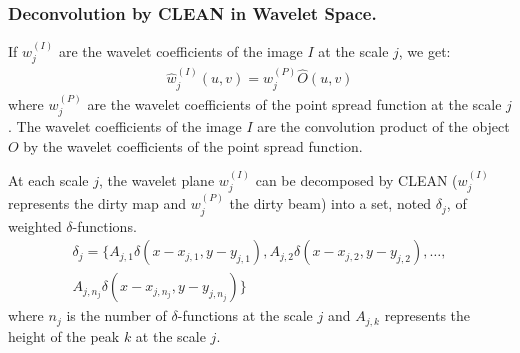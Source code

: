 \documentclass[11pt,a4paper]{article}
\begin{document}
\subsubsection{Deconvolution by CLEAN in Wavelet Space.}

If $w_j^{(I)}$ are the wavelet 
coefficients of  the image $I$ at the scale $j$, we
get:
\begin{eqnarray}
\hat{w}_j^{(I)}(u,v) =  \hat{w}_j^{(P)} \hat{O}(u,v) 
\end{eqnarray}
where $w_{j}^{(P)}$ are the wavelet coefficients of the point spread 
function at the scale $j$.
The wavelet coefficients of the image $I$ are the   convolution product
of the object $O$ by the  wavelet coefficients of the point spread 
function.

At each scale $j$, the wavelet plane $w_j^{(I)}$ can be decomposed by CLEAN 
($w_j^{(I)}$ represents the dirty map and $w_{j}^{(P)}$  the dirty beam)
into a set, noted $\delta_j$, of weighted $\delta$-functions.
\begin{eqnarray}
\delta_j  = \{A_{j,1} \delta(x-x_{j,1}, y-y_{j,1}), A_{j,2} \delta(x-x_{j,2},
 y-y_{j,2}), \dots,  \\ \nonumber
A_{j,n_j} \delta(x-x_{j,n_j}, y-y_{j,n_j})\}
\end{eqnarray}
 where $n_j$ is the number of $\delta$-functions at the scale $j$  
and $A_{j,k}$ represents the height of the peak $k$ at the scale $j$.
\end{document}
